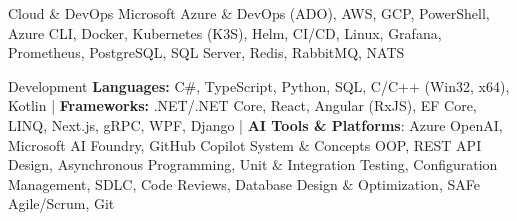 

\begin{cvskills}

  \cvskill
    {Cloud \& DevOps} %
    {Microsoft Azure \& DevOps (ADO), AWS, GCP, PowerShell, Azure CLI, Docker, Kubernetes (K3S), Helm, CI/CD, Linux, Grafana, Prometheus, PostgreSQL, SQL Server, Redis, RabbitMQ, NATS} %

  \cvskill
    {Development} %
    {\textbf{Languages:} C\#, TypeScript, Python, SQL, C/C++ (Win32, x64), Kotlin |
    \textbf{Frameworks:} .NET/.NET Core, React, Angular (RxJS), EF Core, LINQ, Next.js, gRPC, WPF, Django |
    \textbf{AI Tools \& Platforms}: Azure OpenAI, Microsoft AI Foundry, GitHub Copilot} %
  \cvskill
    {System \& Concepts} %
    {OOP, REST API Design, Asynchronous Programming, Unit \& Integration Testing, Configuration Management, SDLC, Code Reviews, Database Design \& Optimization, SAFe Agile/Scrum, Git} %

\end{cvskills}

